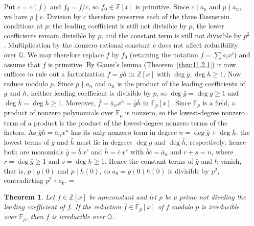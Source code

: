 \documentclass[11pt]{article}
\makeatletter
\theoremstyle{ntstyle}
\newtheorem{theorem}{Theorem}[subsection]
\let\nt@closedisplay\]
\def\nt@guardedclose{\@ifnextchar\par{\nt@closeafterpar}{\@ifnextchar\end{\postdisplaypenalty\@M\nt@closedisplay}{\nt@closedisplay}}}
\def\nt@closeafterpar\par{\@ifnextchar\par{\nt@closeafterpar}{\@ifnextchar\end{\postdisplaypenalty\@M\nt@closedisplay\par}{\nt@closedisplay\par}}}
\renewenvironment{proof}[1][\proofname]{\par
  \pushQED{\qed}\normalfont\topsep\medskipamount\edef\nt@afterproof{\@endparpenalty=\the\@endparpenalty\relax}\@beginparpenalty\@M\@endparpenalty\@M\let\]\nt@guardedclose\trivlist\item[]\textit{#1\@addpunct{.}} \ignorespaces}{\ifvmode\addpenalty\@M\fi\popQED\nt@afterproof\endtrivlist\@endpefalse}
\makeatother
\begin{document}
\begin{proof} Put $c=c(f)$ and $f_0=f/c$, so $f_0\in\mathbb{Z}[x]$ is
	primitive. Since $c\mid a_n$ and $p\nmid a_n$, we have $p\nmid c$.
	Division by $c$ therefore preserves each of the three Eisenstein
	conditions at $p$: the leading coefficient is still not divisible by $p$,
	the lower coefficients remain divisible by $p$, and the constant term
	is still not divisible by $p^2$. Multiplication by the nonzero rational
	constant $c$ does not affect reducibility over $\mathbb{Q}$. We may
	therefore replace $f$ by $f_0$ (retaining the notation $f=\sum a_i x^i$)
	and assume that $f$ is primitive. By Gauss's lemma
	(Theorem~\ref{thm:11.2.1}) it now suffices to rule out a factorization $f=gh$ in
	$\mathbb{Z}[x]$ with $\deg g,\deg h\ge1$. Now reduce modulo $p$. Since $p\nmid a_n$ and $a_n$ is the product of
	the leading coefficients of $g$ and $h$, neither leading
	coefficient is divisible by $p$, so $\deg\bar g=\deg g\ge1$ and
	$\deg\bar h=\deg h\ge1$. Moreover, $\bar f = \bar a_n x^n = \bar g\bar h$
	in $\mathbb{F}_p[x]$.
		Since $\mathbb{F}_p$ is a field, a product of nonzero polynomials over $\mathbb{F}_p$ is nonzero,
		so the lowest-degree nonzero term of a product is the product of the lowest-degree nonzero terms
		of the factors.
		As $\bar g\bar h=\bar a_n x^n$ has its only nonzero term in degree $n=\deg\bar g+\deg\bar h$, the
		lowest terms of $\bar g$ and $\bar h$ must lie in degrees $\deg\bar g$ and $\deg\bar h$,
		respectively;
		hence both are monomials $\bar g = \bar b\,x^{r}$ and $\bar h = \bar c\,x^{s}$ with $\bar b\bar c=\bar a_n$
	and $r+s=n$, where $r=\deg\bar g\ge1$ and $s=\deg\bar h\ge1$.
	Hence the constant terms of $\bar g$ and $\bar h$ vanish, that is, $p\mid
		g(0)$ and $p\mid h(0)$, so $a_0 = g(0)h(0)$ is divisible by $p^2$,
	contradicting $p^2\nmid a_0$.
\end{proof}
\begin{theorem}\label{thm:11.3.2} Let $f\in\mathbb{Z}[x]$ be nonconstant and let
	$p$ be a prime not dividing the leading coefficient of $f$. If the
	reduction $\bar f\in\mathbb{F}_p[x]$ of $f$ modulo $p$ is irreducible
	over $\mathbb{F}_p$, then $f$ is irreducible over $\mathbb{Q}$.
\end{theorem}
\end{document}
